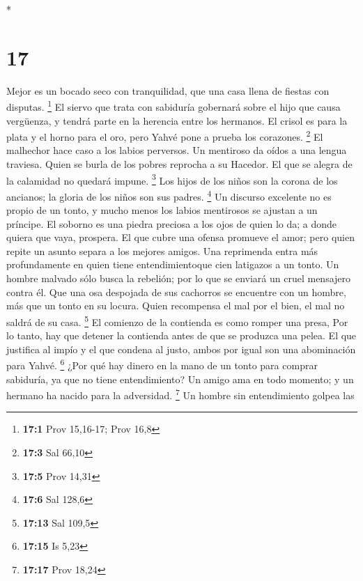 \begin{paracol}{2}
\begin{otherlanguage}{english}
\end{otherlanguage}

\switchcolumn[0]*

\hypertarget{section-32}{%
\section{17}\label{section-32}}

 Mejor es un bocado seco con tranquilidad, que una casa
llena de fiestas con disputas. \footnote{\textbf{17:1} Prov 15,16-17;
  Prov 16,8}  El siervo que trata con sabiduría gobernará
sobre el hijo que causa vergüenza, y tendrá parte en la herencia entre
los hermanos.  El crisol es para la plata y el horno para
el oro, pero Yahvé pone a prueba los corazones. \footnote{\textbf{17:3}
  Sal 66,10}  El malhechor hace caso a los labios
perversos. Un mentiroso da oídos a una lengua traviesa. 
Quien se burla de los pobres reprocha a su Hacedor. El que se alegra de
la calamidad no quedará impune. \footnote{\textbf{17:5} Prov 14,31}
 Los hijos de los niños son la corona de los ancianos; la
gloria de los niños son sus padres. \footnote{\textbf{17:6} Sal 128,6}
 Un discurso excelente no es propio de un tonto, y mucho
menos los labios mentirosos se ajustan a un príncipe.  El
soborno es una piedra preciosa a los ojos de quien lo da; a donde quiera
que vaya, prospera.  El que cubre una ofensa promueve el
amor; pero quien repite un asunto separa a los mejores amigos.
 Una reprimenda entra más profundamente en quien tiene
entendimientoque cien latigazos a un tonto.  Un hombre
malvado sólo busca la rebelión; por lo que se enviará un cruel mensajero
contra él.  Que una osa despojada de sus cachorros se
encuentre con un hombre, más que un tonto en su locura. 
Quien recompensa el mal por el bien, el mal no saldrá de su casa.
\footnote{\textbf{17:13} Sal 109,5}  El comienzo de la
contienda es como romper una presa, Por lo tanto, hay que detener la
contienda antes de que se produzca una pelea.  El que
justifica al impío y el que condena al justo, ambos por igual son una
abominación para Yahvé. \footnote{\textbf{17:15} Is 5,23}
 ¿Por qué hay dinero en la mano de un tonto para comprar
sabiduría, ya que no tiene entendimiento?  Un amigo ama
en todo momento; y un hermano ha nacido para la adversidad. \footnote{\textbf{17:17}
  Prov 18,24}  Un hombre sin entendimiento golpea las

\end{paracol}
